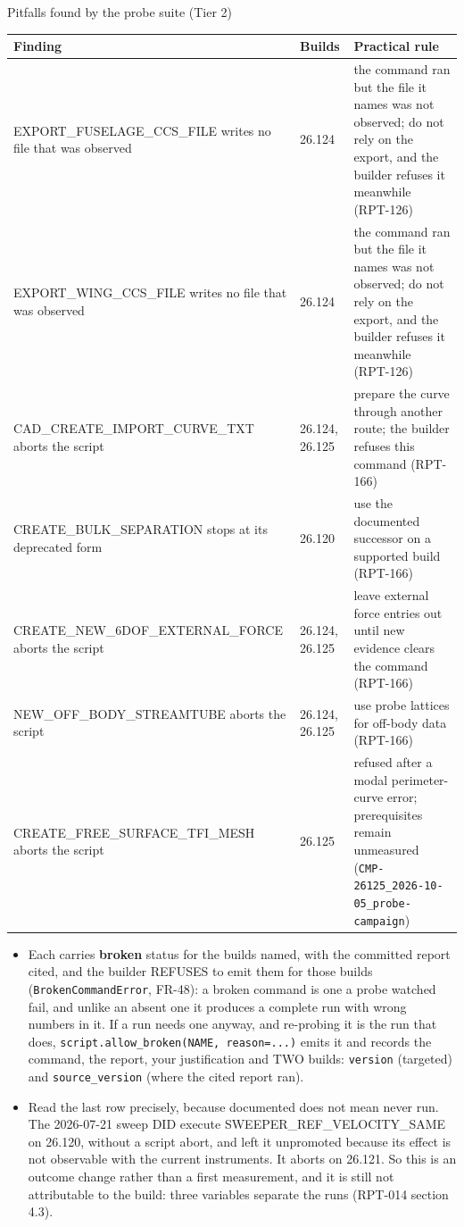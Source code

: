 \documentclass[aspectratio=169,10pt]{beamer}
\newcommand{\code}[1]{\texttt{\small #1}}
\begin{document}
\begin{frame}[allowframebreaks]{Pitfalls found by the probe suite (Tier 2)}
  \begin{tabular}{@{}p{6.0cm}p{1.6cm}p{6.5cm}@{}}
    \toprule
    Finding & Builds & Practical rule \\
    \midrule
    EXPORT\_FUSELAGE\_CCS\_FILE writes no file that was observed & 26.124 & the command ran but the file it names was not observed; do not rely on the export, and the builder refuses it meanwhile (RPT-126) \\
    EXPORT\_WING\_CCS\_FILE writes no file that was observed & 26.124 & the command ran but the file it names was not observed; do not rely on the export, and the builder refuses it meanwhile (RPT-126) \\
    CAD\_CREATE\_IMPORT\_CURVE\_TXT aborts the script & 26.124, 26.125 & prepare the curve through another route; the builder refuses this command (RPT-166) \\
    CREATE\_BULK\_SEPARATION stops at its deprecated form & 26.120 & use the documented successor on a supported build (RPT-166) \\
    CREATE\_NEW\_6DOF\_EXTERNAL\_FORCE aborts the script & 26.124, 26.125 & leave external force entries out until new evidence clears the command (RPT-166) \\
    NEW\_OFF\_BODY\_STREAMTUBE aborts the script & 26.124, 26.125 & use probe lattices for off-body data (RPT-166) \\
    CREATE\_FREE\_SURFACE\_TFI\_MESH aborts the script & 26.125 & refused after a modal perimeter-curve error; prerequisites remain unmeasured (\code{CMP-26125\_2026-10-05\_\allowbreak probe-campaign}) \\
    \bottomrule
  \end{tabular}
  \vspace{2mm}
  \begin{itemize}
    \item Each carries {\color{statusred}\textbf{broken}} status for the builds named, with the committed report cited, and the builder REFUSES to emit them for those builds (\code{BrokenCommandError}, FR-48): a broken command is one a probe watched fail, and unlike an absent one it produces a complete run with wrong numbers in it. If a run needs one anyway, and re-probing it is the run that does, \code{script.allow\_broken(NAME, reason=...)} emits it and records the command, the report, your justification and TWO builds: \code{version} (targeted) and \code{source\_version} (where the cited report ran).
      \item Read the last row precisely, because {\color{statusgreen}documented} does not mean never run. The 2026-07-21 sweep DID execute SWEEPER\_REF\_VELOCITY\_SAME on 26.120, without a script abort, and left it unpromoted because its effect is not observable with the current instruments. It aborts on 26.121. So this is an outcome change rather than a first measurement, and it is still not attributable to the build: three variables separate the runs (RPT-014 section 4.3).

\end{itemize}
\end{frame}
\end{document}
